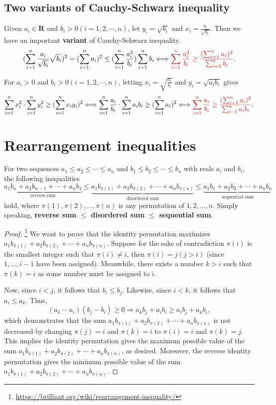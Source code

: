 \documentclass{article}
\theoremstyle{remark}
\def\R{\mathbf{R}}
\begin{document}
\subsection{Two variants of Cauchy-Schwarz inequality}
Given $a_i\in\R$ and $b_i>0(i=1,2,\cdots,n)$, let $y_i=\sqrt{b_i}$ and $x_i=\frac{a_i}{\sqrt{b_i}}$. Then we have an important \textbf{variant} of Cauchy-Schwarz inequality.
\[
(\sum_{i=1}^{n}\frac{a_i}{\sqrt{b_i}}\sqrt{b_i})^2=(\sum_{i=1}^{n}a_i)^2\le (\sum_{i=1}^{n}\frac{a_i^2}{b_i})\sum_{i=1}^{n}b_i\Longleftrightarrow {\color{red}\sum_{i=1}^{n}\frac{a_i^2}{b_i}\ge \frac{(\sum_{i=1}^{n}a_i)^2}{\sum_{i=1}^{n}b_i}}.
\]

For $a_i>0$ and $b_i>0(i=1,2,\cdots,n)$, letting $x_i=\sqrt{\frac{a_i}{b_i}}$ and $y_i=\sqrt{a_ib_i}$ gives
\[
\sum_{i=1}^{n}x_i^2\cdot\sum_{i=1}^{n}y_i^2\ge (\sum_{i=1}^{n}x_iy_i)^2\Longleftrightarrow \sum_{i=1}^{n}\frac{a_i}{b_i}\cdot\sum_{i=1}^{n}a_ib_i\ge (\sum_{i=1}^{n}a_i)^2\Longleftrightarrow {\color{red}\sum_{i=1}^{n}\frac{a_i}{b_i}\ge \frac{(\sum_{i=1}^{n}a_i)^2}{\sum_{i=1}^{n}a_ib_i}}.
\]

\section{Rearrangement inequalities}
For two sequences $a_1\le a_2\le \cdots\le a_n$ and $b_1\le b_2\le \cdots\le b_n$ with reals $a_i$ and $b_i$, the following inequalities
\[
\underbrace{a_1b_n+a_2b_{n-1}+\cdots+a_nb_1}_{\text{reverse sum}}\le \underbrace{a_1b_{\pi(1)}+a_2b_{\pi(2)}+\cdots+a_nb_{\pi(n)}}_{\text{disordered sum}}\le \underbrace{a_1b_1+a_2b_2+\cdots+a_nb_n}_{\text{sequential sum}}
\]
hold, where $\pi(1),\pi(2),\ldots,\pi(n)$ is any permutation of $1,2,\ldots,n$. Simply speaking, \textbf{\textcolor[rgb]{1.00,0.00,0.00}{reverse sum $\le$ disordered sum $\le$ sequential sum}}.
\begin{proof}\footnote{\url{https://brilliant.org/wiki/rearrangement-inequality/}}
We want to prove that the identity permutation maximizes $a_1b_{\pi(1)}+a_2b_{\pi(2)}+\cdots+a_nb_{\pi(n)}$. Suppose for the sake of contradiction $\pi(i)$ is the smallest integer such that $\pi(i)\neq i$, then $\pi(i)=j(j>i)$ (since $1,\ldots,i-1$ have been assigned). Meanwhile, there exists a number $k>i$ such that $\pi(k)=i$ as some number must be assigned to $i$.

Now, since $i<j$, it follows that $b_i\le b_j$. Likewise, since $i<k$, it follows that $a_i\le a_k$. Thus,
\[
(a_k-a_i)(b_j-b_i)\ge 0 \Longrightarrow a_kb_j + a_ib_i\ge a_ib_j + a_kb_i,
\]
which demonstrates that the sum $a_1b_{\pi(1)}+a_2b_{\pi(2)}+\cdots+a_nb_{\pi(n)}$ is not decreased by changing $\pi(j)=i$ and $\pi(k)=i$ to $\pi(i)=i$ and $\pi(k)=j$. This implies the identity permutation gives the maximum possible value of the sum $a_1b_{\pi(1)}+a_2b_{\pi(2)}+\cdots+a_nb_{\pi(n)}$, as desired. Moreover, the reverse identity permutation gives the minimum possible value of the sum $a_1b_{\pi(1)}+a_2b_{\pi(2)}+\cdots+a_nb_{\pi(n)}$.
\end{proof}
\end{document}
